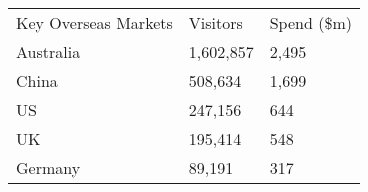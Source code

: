 \begin{tabular}[t]{p{5.1cm}>{\hfill}p{1.1cm}>{\hfill}p{1.3cm}}
 Key Overseas Markets & Visitors & Spend (\$m) \\ 
 Australia & 1,602,857 & 2,495 \\ 
  China &   508,634 & 1,699 \\ 
  US &   247,156 & 644 \\ 
  UK &   195,414 & 548 \\ 
  Germany &    89,191 & 317 \\ 
  \end{tabular}

